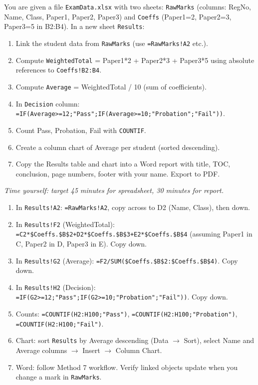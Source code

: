 \documentclass[11pt]{article}
\begin{document}
\begin{exercice}
You are given a file \texttt{ExamData.xlsx} with two sheets: \texttt{RawMarks} (columns: RegNo, Name, Class, Paper1, Paper2, Paper3) and \texttt{Coeffs} (Paper1=2, Paper2=3, Paper3=5 in B2:B4). In a new sheet \texttt{Results}:
\begin{enumerate}
\item Link the student data from \texttt{RawMarks} (use \texttt{=RawMarks!A2} etc.).
\item Compute \texttt{WeightedTotal} = Paper1*2 + Paper2*3 + Paper3*5 using absolute references to \texttt{Coeffs!B2:B4}.
\item Compute \texttt{Average} = WeightedTotal / 10 (sum of coefficients).
\item In \texttt{Decision} column: \texttt{=IF(Average>=12;"Pass";IF(Average>=10;"Probation";"Fail"))}.
\item Count Pass, Probation, Fail with \texttt{COUNTIF}.
\item Create a column chart of Average per student (sorted descending).
\item Copy the Results table and chart into a Word report with title, TOC, conclusion, page numbers, footer with your name. Export to PDF.
\end{enumerate}
\textit{Time yourself: target 45 minutes for spreadsheet, 30 minutes for report.}
\end{exercice}

\begin{corrige}
\begin{enumerate}
\item In \texttt{Results!A2}: \texttt{=RawMarks!A2}, copy across to D2 (Name, Class), then down.
\item In \texttt{Results!F2} (WeightedTotal): \texttt{=C2*\$Coeffs.\$B\$2+D2*\$Coeffs.\$B\$3+E2*\$Coeffs.\$B\$4} (assuming Paper1 in C, Paper2 in D, Paper3 in E). Copy down.
\item In \texttt{Results!G2} (Average): \texttt{=F2/SUM(\$Coeffs.\$B\$2:\$Coeffs.\$B\$4)}. Copy down.
\item In \texttt{Results!H2} (Decision): \texttt{=IF(G2>=12;"Pass";IF(G2>=10;"Probation";"Fail"))}. Copy down.
\item Counts: \texttt{=COUNTIF(H2:H100;"Pass")}, \texttt{=COUNTIF(H2:H100;"Probation")}, \texttt{=COUNTIF(H2:H100;"Fail")}.
\item Chart: sort \texttt{Results} by Average descending (Data $\rightarrow$ Sort), select Name and Average columns $\rightarrow$ Insert $\rightarrow$ Column Chart.
\item Word: follow Method 7 workflow. Verify linked objects update when you change a mark in \texttt{RawMarks}.
\end{enumerate}
\end{corrige}
\end{document}
